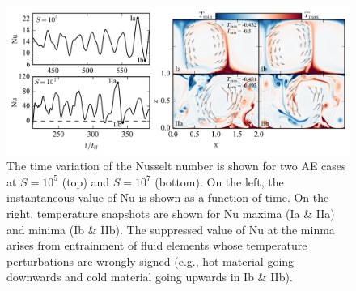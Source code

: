 \documentclass[aps, pre, onecolumn, nofootinbib, notitlepage, groupedaddress, amsfonts, amssymb, amsmath, longbibliography]{revtex4-1}
\begin{document}
\begin{figure}[t!]
\includegraphics[width=\textwidth]{./figs/oscillating_plumes.png}
\caption{The time variation of the Nusselt number is shown for two AE cases at
$S = 10^5$ (top) and $S = 10^7$ (bottom). On the left, the instantaneous value of Nu
is shown as a function of time. On the right, temperature snapshots are shown for
Nu maxima (Ia \& IIa) and minima (Ib \& IIb). The suppressed value of Nu at the
minma arises from entrainment of fluid elements whose temperature perturbations
are wrongly signed (e.g., hot material going downwards and cold material going
upwards in Ib \& IIb).\vspace{-1cm} \label{fig:oscillating_plumes} }
\end{figure}
\end{document}
